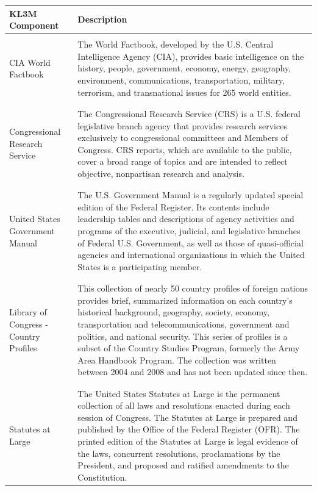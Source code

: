 \documentclass{article}
\begin{document}
\begin{appendices}
\begin{table}[h]
\scriptsize
\begin{longtable}{ p{3cm} p{9cm} }
\textbf{KL3M Component}      
& \textbf{Description}  
\\\midrule
\\
CIA World Factbook &
The World Factbook, developed by the U.S. Central Intelligence Agency (CIA), provides basic intelligence on the history, people, government, economy, energy, geography, environment, communications, transportation, military, terrorism, and transnational issues for 265 world entities.   
\\   
 \\\hline
  \\
Congressional Research Service    
& The Congressional Research Service (CRS) is a U.S. federal legislative branch agency that provides research services exclusively to congressional committees and Members of Congress. CRS reports, which are available to the public, cover a broad range of topics and are intended to reflect objective, nonpartisan research and analysis.
\\
 \\\hline
  \\
United States Government Manual &
The U.S. Government Manual is a regularly updated special edition of the Federal Register. Its contents include leadership tables and descriptions of agency activities and programs of the executive, judicial, and legislative branches of Federal U.S. Government, as well as those of quasi-official agencies and international organizations in which the United States is a participating member.
\\   
 \\\hline
  \\
Library of Congress - Country Profiles &
This collection of nearly 50 country profiles of foreign nations provides brief, summarized information on each country’s historical background, geography, society, economy, transportation and telecommunications, government and politics, and national security. This series of profiles is a subset of the Country Studies Program, formerly the Army Area Handbook Program. The collection was written between 2004 and 2008 and has not been updated since then.  
\\   
 \\\hline
  \\
Statutes at Large &
The United States Statutes at Large is the permanent collection of all laws and resolutions enacted during each session of Congress. The Statutes at Large is prepared and published by the Office of the Federal Register (OFR). The printed edition of the Statutes at Large is legal evidence of the laws, concurrent resolutions, proclamations by the President, and proposed and ratified amendments to the Constitution.  \\   

\end{longtable}
\end{table}
\end{appendices}
\end{document}
